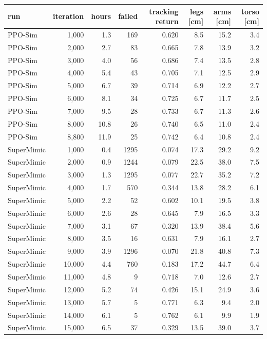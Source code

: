 \begin{tabular}{lrrrrrrr}\toprule
run & iteration & hours & failed & tracking return & legs [cm] & arms [cm] & torso [cm] \\\midrule
PPO-Sim & 1,000 & 1.3 & 169 & 0.620 & 8.5 & 15.2 & 3.4 \\
PPO-Sim & 2,000 & 2.7 & 83 & 0.665 & 7.8 & 13.9 & 3.2 \\
PPO-Sim & 3,000 & 4.0 & 56 & 0.686 & 7.4 & 13.5 & 2.8 \\
PPO-Sim & 4,000 & 5.4 & 43 & 0.705 & 7.1 & 12.5 & 2.9 \\
PPO-Sim & 5,000 & 6.7 & 39 & 0.714 & 6.9 & 12.2 & 2.7 \\
PPO-Sim & 6,000 & 8.1 & 34 & 0.725 & 6.7 & 11.7 & 2.5 \\
PPO-Sim & 7,000 & 9.5 & 28 & 0.733 & 6.7 & 11.3 & 2.6 \\
PPO-Sim & 8,000 & 10.8 & 26 & 0.740 & 6.5 & 11.0 & 2.4 \\
PPO-Sim & 8,800 & 11.9 & 25 & 0.742 & 6.4 & 10.8 & 2.4 \\
\midrule
SuperMimic & 1,000 & 0.4 & 1295 & 0.074 & 17.3 & 29.2 & 9.2 \\
SuperMimic & 2,000 & 0.9 & 1244 & 0.079 & 22.5 & 38.0 & 7.5 \\
SuperMimic & 3,000 & 1.3 & 1295 & 0.077 & 22.7 & 35.2 & 7.2 \\
SuperMimic & 4,000 & 1.7 & 570 & 0.344 & 13.8 & 28.2 & 6.1 \\
SuperMimic & 5,000 & 2.2 & 52 & 0.602 & 10.1 & 19.5 & 3.8 \\
SuperMimic & 6,000 & 2.6 & 28 & 0.645 & 7.9 & 16.5 & 3.3 \\
SuperMimic & 7,000 & 3.1 & 67 & 0.320 & 13.9 & 38.4 & 5.6 \\
SuperMimic & 8,000 & 3.5 & 16 & 0.631 & 7.9 & 16.1 & 2.7 \\
SuperMimic & 9,000 & 3.9 & 1296 & 0.070 & 21.8 & 40.8 & 7.3 \\
SuperMimic & 10,000 & 4.4 & 760 & 0.183 & 17.2 & 44.7 & 6.4 \\
SuperMimic & 11,000 & 4.8 & 9 & 0.718 & 7.0 & 12.6 & 2.7 \\
SuperMimic & 12,000 & 5.2 & 74 & 0.426 & 15.1 & 24.9 & 3.6 \\
SuperMimic & 13,000 & 5.7 & 5 & 0.771 & 6.3 & 9.4 & 2.0 \\
SuperMimic & 14,000 & 6.1 & 5 & 0.762 & 6.1 & 9.9 & 1.9 \\
SuperMimic & 15,000 & 6.5 & 37 & 0.329 & 13.5 & 39.0 & 3.7 \\

\end{tabular}
